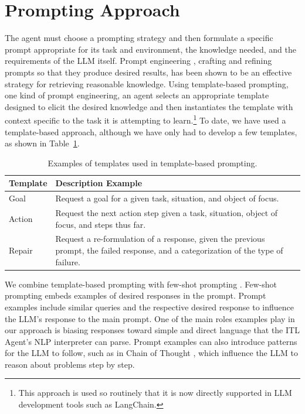 \documentclass[letterpaper]{article} %
\begin{document}
\section{Prompting Approach}
The agent must choose a prompting strategy and then formulate a specific prompt appropriate for its task and environment, the knowledge needed, and the requirements of the LLM itself. Prompt engineering \cite{reynolds_prompt_2021}, crafting and refining prompts so that they produce  desired results, has been shown to be an effective strategy for retrieving reasonable knowledge. Using template-based prompting, one kind of prompt engineering, an agent selects an appropriate template designed to elicit the desired knowledge and then instantiates the template with context specific to the task it is attempting to learn.\footnote{This approach is used so routinely that it is now directly supported in LLM development tools such as LangChain.} To date, we have used a template-based approach, although we have only had to develop a few templates, as shown in Table~\ref{tab:prompt-templates}.

\begin{table}[tb]
\begin{tabular}{lp{}}
\hline
\textbf{Template}        & \textbf{Description Example}                                     \\ \hline \hline
Goal & Request a goal for a given task, situation,
and object of focus. \\
Action & Request the next action step given a task, situation, object of focus, and steps thus far.\\
Repair & Request a re-formulation of a response, given the previous prompt, the failed response, and a categorization of the type of failure. \\

\hline
\end{tabular}
\caption{Examples of templates used in template-based prompting.}
\label{tab:prompt-templates}
\end{table}

We combine template-based prompting with few-shot prompting
\cite{brown_language_2020}. Few-shot prompting embeds examples of desired responses in the prompt. Prompt examples include similar queries and the respective desired response to influence the LLM's response to the main prompt. One of the main roles examples play in our approach is biasing responses toward simple and direct language that the ITL Agent's NLP interpreter can parse. Prompt examples can also introduce patterns for the LLM to follow, such as in Chain of Thought \cite{wei_chain--thought_2022}, which influence the LLM to reason about problems step by step.
\end{document}
